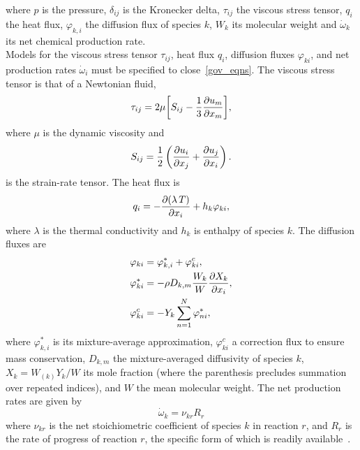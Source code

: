 \documentclass{article}
\begin{document}
where $p$ is the pressure, $\delta_{ij}$ is the Kronecker delta, $\tau_{ij}$ the viscous stress tensor, $q_{i}$ the heat flux, $\varphi_{k,i}$ the diffusion flux of species $k$, $W_{k}$ its molecular weight and $\dot{\omega}_{k}$ its net chemical production rate. \\

Models for the viscous stress tensor $\tau_{ij}$, heat flux $q_{i}$, diffusion fluxes $\varphi_{ki}$, and net production rates $\dot{\omega}_{i}$ must be specified to close~\eqref{gov_eqns}. The viscous stress tensor is that of a Newtonian fluid,
\begin{equation}\label{eq:vstress_tens}
  \tau_{ij} = 2\mu{\left[ S_{ij} - \frac{1}{3}\frac{\partial u_{m}}{\partial x_{m}} \right]},
\end{equation}
where $\mu$ is the dynamic viscosity and
\begin{equation}\label{eq:strain_rate}
  S_{ij} = \frac{1}{2}\left(  \frac{\partial u_{i}}{\partial x_{j}} + \frac{\partial u_{j}}{\partial x_{i}}  \right).
\end{equation}
is the strain-rate tensor. The heat flux is
\begin{equation}\label{eq:heat_flux}
  q_{i} = -\frac{\partial(\lambda\, T)}{\partial x_{i}} + h_{k} \varphi_{ki},
\end{equation}
where $\lambda$ is the thermal conductivity and $h_{k}$ is enthalpy of species $k$. The diffusion fluxes are
\begin{align}\label{eq:diff_vel}
  \varphi_{ki} &= \varphi_{k,i}^{\ast} + \varphi_{ki}^{c}, \\
  \varphi_{ki}^{\ast} &= -\rho D_{k,m}\frac{W_{k}}{W}\frac{\partial X_{k}}{\partial x_{i}}, \\
  \varphi_{ki}^{c} &= -Y_{k}\sum_{n = 1}^{N}\varphi_{ni}^{\ast},
\end{align}
where $\varphi_{k,i}^{\ast}$ is its mixture-average approximation, $\varphi_{ki}^{c}$ a correction flux to ensure mass conservation, $D_{k,m}$ the mixture-averaged diffusivity of species $k$, $X_{k} = W_{(k)}Y_{k}/W$ its mole fraction (where the parenthesis precludes summation over repeated indices), and $W$ the mean molecular weight. The net production rates are given by
\begin{equation}\label{eq:omega}
  \dot{\omega}_{k} = \nu_{kr}R_{r}
\end{equation}
where $\nu_{kr}$ is the net stoichiometric coefficient of species $k$ in reaction $r$, and $R_{r}$ is the rate of progress of reaction $r$, the specific form of which is readily available~\cite{ref:Glassman2014,ref:Williams2018}. \\
\end{document}
